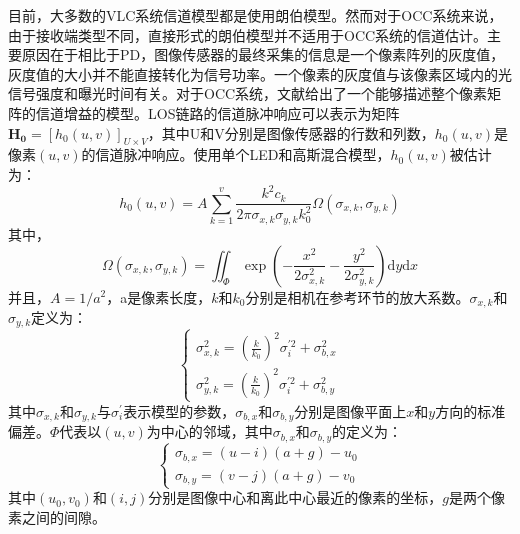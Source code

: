 目前，大多数的VLC系统信道模型都是使用朗伯模型。然而对于OCC系统来说，由于接收端类型不同，直接形式的朗伯模型并不适用于OCC系统的信道估计。主要原因在于相比于PD，图像传感器的最终采集的信息是一个像素阵列的灰度值，灰度值的大小并不能直接转化为信号功率。一个像素的灰度值与该像素区域内的光信号强度和曝光时间有关。对于OCC系统，文献\parencite{los-channel-model}给出了一个能够描述整个像素矩阵的信道增益的模型。LOS链路的信道脉冲响应可以表示为矩阵$\mathbf{H_0} = [h_0(u, v)]_{U \times V}$，其中U和V分别是图像传感器的行数和列数，$h_0(u, v)$是像素$(u, v)$的信道脉冲响应。使用单个LED和高斯混合模型，$h_0(u, v)$被估计为：
\begin{equation} \label{h0uv}
  h_{0}(u,v)=A\sum_{k=1}^{v} \frac{k^{2}c_{k}}{2\pi \sigma _{x,k}\sigma _{y,k}k_{0}^{2}}\Omega(\sigma _{x,k},\sigma _{y,k})
\end{equation}
其中，
\begin{equation} \label{omega}
  \Omega(\sigma _{x,k},\sigma _{y,k}) =\iint _{\Phi}\exp (-\frac{x^{2}}{2\sigma _{x,k}^{2}} -\frac{y^{2}}{2\sigma _{y,k}^{2}}){\mathrm{d} y}{\mathrm{d} x}
\end{equation}
并且，$A=1/a^2$，a是像素长度，$k$和$k_0$分别是相机在参考环节的放大系数。$\sigma_{x,k}$和$\sigma_{y,k}$定义为：
\begin{equation} \label{sigma xk,yk}
  \begin{cases}
    \sigma _{x,k}^{2}=(\frac{k}{k_{0}})^{2}\sigma_{i}^{'2}+ \sigma _{b,x}^{2}\\
   \sigma _{y,k}^{2}=(\frac{k}{k_{0}})^{2}\sigma_{i}^{'2}+ \sigma _{b,y}^{2}	
 \end{cases}
\end{equation}
其中$\sigma_{x,k}$和$\sigma_{y,k}$与$\sigma^′_i$表示模型的参数，$\sigma_{b,x}$和$\sigma_{b,y}$分别是图像平面上$x$和$y$方向的标准偏差。$Φ$代表以$(u, v)$为中心的邻域，其中$\sigma _{b,x}$和$\sigma _{b,y}$的定义为：
\begin{equation} \label{ax,ay}
  \begin{cases}
    \sigma _{b,x}=(u-i)(a+g)-u_{0}\\
    \sigma _{b,y}=(v-j)(a+g)-v_{0}	
 \end{cases}
\end{equation}
其中$(u_0, v_0)$和$(i, j)$分别是图像中心和离此中心最近的像素的坐标，$g$是两个像素之间的间隙。 


